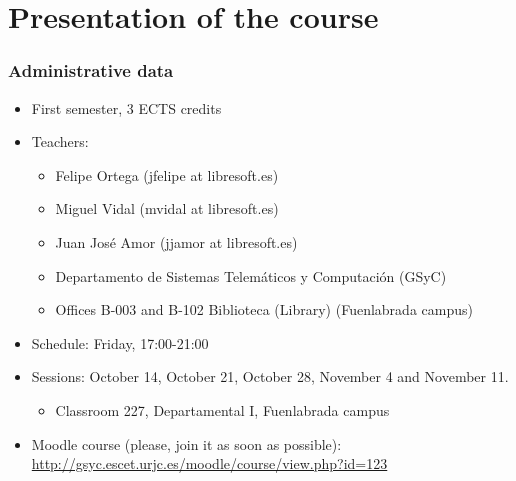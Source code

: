 

\section{Presentation of the course}


\begin{frame}
\frametitle{Administrative data}

\begin{itemize}
\item First semester, 3 ECTS credits
\item Teachers:
  \begin{itemize}
  \item Felipe Ortega (jfelipe at libresoft.es)
  \item Miguel Vidal (mvidal at libresoft.es)
  \item Juan José Amor (jjamor at libresoft.es)
  \item Departamento de Sistemas Telemáticos y Computación (GSyC)
  \item Offices B-003 and B-102 Biblioteca (Library) (Fuenlabrada campus)
  \end{itemize}
\item Schedule: Friday, 17:00-21:00
\item Sessions: October 14, October 21, October 28, November 4 and November 11.
  \begin{itemize}
  \item Classroom 227, Departamental I, Fuenlabrada campus
  \end{itemize}
\item Moodle course (please, join it as soon as possible): \\
  \url{http://gsyc.escet.urjc.es/moodle/course/view.php?id=123}
\end{itemize}
\end{frame}


